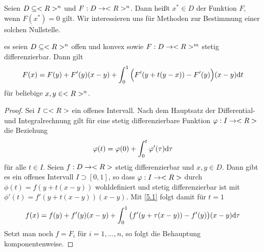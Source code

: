 Seien $D\subseteq<R>^n$ und $F:D\to<R>^n$. Dann heißt $x^\ast\in D$  der Funktion $F$, wenn $F(x^\ast)=0$ gilt. Wir interessieren uns für Methoden zur Bestimmung einer solchen Nullstelle.

\setcounter{theorem}{0}
\begin{proposition}
	es seien $D\subseteq<R>^n$ offen und konvex sowie $F:D\to<R>^m$ stetig differenzierbar. Dann gilt
	\begin{align}
		F(x) = F(y) + F'(y)(x-y) + \int_0^1 \Big(F'(y+t(y-x)) - F'(y)\Big)(x-y)\mathrm{d} t\notag
	\end{align}
	für beliebige $x,y\in<R>^n$.
\end{proposition}
\begin{proof}
	Sei $I\subset<R>$ ein offenes Intervall. Nach dem Hauptsatz der Differential- und Integralrechnung gilt für eine stetig differenzierbare Funktion $\varphi:I\to<R>$ die Beziehung
	\begin{align}
		\label{5.1}
		\varphi(t) = \varphi(0) + \int_0^t \varphi'(\tau)\mathrm{d}\tau
	\end{align}
	für alle $t\in I$. Seien $f:D\to<R>$ stetig differenzierbar und $x,y\in D$. Dann gibt es ein offenes Intervall $I\supset [0,1]$, so dass $\varphi:I\to<R>$ durch $\phi(t) = f(y+t(x-y))$ wohldefiniert und stetig differenzierbar ist mit $\phi'(t)=f'(y+t(x-y))(x-y)$. Mit \cref{5.1} folgt damit für $t=1$
	\begin{align}
		f(x) = f(y) + f'(y)(x-y) + \int_0^1 \big(f'(y+\tau(x-y)) - f'(y)\big)(x-y)\mathrm{d}\tau\notag
	\end{align}
	Setzt man noch $f=F_i$ für $i=1,...,n$, so folgt die Behauptung komponentenweise.
\end{proof}